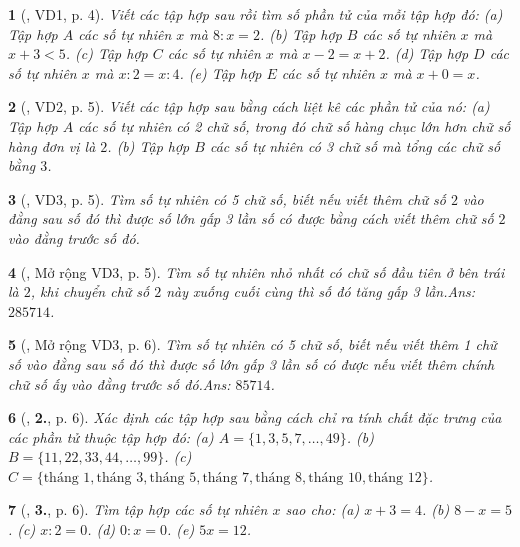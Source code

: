 \documentclass{article}
\newtheorem{baitoan}{}
\begin{document}
\begin{baitoan}[\cite{Binh_Toan_6_tap_1}, VD1, p. 4]
	Viết các tập hợp sau rồi tìm số phần tử của mỗi tập hợp đó: (a) Tập hợp $A$ các số tự nhiên $x$ mà $8:x = 2$. (b) Tập hợp $B$ các số tự nhiên $x$ mà $x + 3 < 5$. (c) Tập hợp $C$ các số tự nhiên $x$ mà $x - 2 = x + 2$. (d) Tập hợp $D$ các số tự nhiên $x$ mà $x:2 = x:4$. (e) Tập hợp $E$ các số tự nhiên $x$ mà $x + 0 = x$.
\end{baitoan}

\begin{baitoan}[\cite{Binh_Toan_6_tap_1}, VD2, p. 5]
	Viết các tập hợp sau bằng cách liệt kê các phần tử của nó: (a) Tập hợp $A$ các số tự nhiên có 2 chữ số, trong đó chữ số hàng chục lớn hơn chữ số hàng đơn vị là $2$. (b) Tập hợp $B$ các số tự nhiên có 3 chữ số mà tổng các chữ số bằng $3$.
\end{baitoan}

\begin{baitoan}[\cite{Binh_Toan_6_tap_1}, VD3, p. 5]
	Tìm số tự nhiên có 5 chữ số, biết nếu viết thêm chữ số $2$ vào đằng sau số đó thì được số lớn gấp 3 lần số có được bằng cách viết thêm chữ số $2$ vào đằng trước số đó.
\end{baitoan}

\begin{baitoan}[\cite{Binh_Toan_6_tap_1}, Mở rộng VD3, p. 5]
	Tìm số tự nhiên nhỏ nhất có chữ số đầu tiên ở bên trái là $2$, khi chuyển chữ số $2$ này xuống cuối cùng thì số đó tăng gấp 3 lần.\hfill{\sf Ans:} $285714$.
\end{baitoan}

\begin{baitoan}[\cite{Binh_Toan_6_tap_1}, Mở rộng VD3, p. 6]
	Tìm số tự nhiên có 5 chữ số, biết nếu viết thêm 1 chữ số vào đằng sau số đó thì được số lớn gấp 3 lần số có được nếu viết thêm chính chữ số ấy vào đằng trước số đó.\hfill{\sf Ans:} $85714$.
\end{baitoan}

\begin{baitoan}[\cite{Binh_Toan_6_tap_1}, \textbf{2.}, p. 6]
	Xác định các tập hợp sau bằng cách chỉ ra tính chất đặc trưng của các phần tử thuộc tập hợp đó: (a) $A = \{1,3,5,7,\ldots,49\}$. (b) $B = \{11,22,33,44,\ldots,99\}$. (c) $C = \{\mbox{tháng } 1,\mbox{tháng } 3,\mbox{tháng } 5,\mbox{tháng } 7,\mbox{tháng } 8,\mbox{tháng } 10,\mbox{tháng } 12\}$.
\end{baitoan}

\begin{baitoan}[\cite{Binh_Toan_6_tap_1}, \textbf{3.}, p. 6]
	Tìm tập hợp các số tự nhiên $x$ sao cho: (a) $x + 3 = 4$. (b) $8 - x = 5$. (c) $x:2 = 0$. (d) $0:x = 0$. (e) $5x = 12$.
\end{baitoan}
\end{document}
